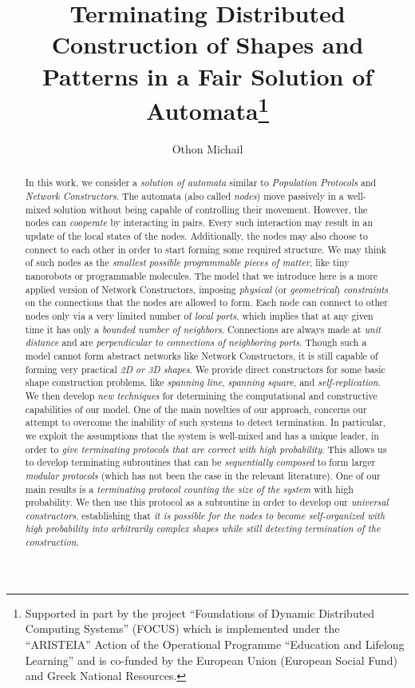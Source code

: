\documentclass[oribibl, 11pt]{llncs}
\title{Terminating Distributed Construction of Shapes and Patterns in a Fair Solution of Automata\thanks{Supported in part by the project ``Foundations of Dynamic Distributed Computing Systems'' (\textsf{FOCUS}) which is implemented under the ``ARISTEIA'' Action of the  Operational Programme ``Education and Lifelong Learning'' and is co-funded by the European Union (European Social Fund) and Greek National Resources.}}
\author{Othon Michail}
\institute{Computer Technology Institute \& Press ``Diophantus'' (CTI), Patras, Greece\\
Email:\email{ michailo@cti.gr}\\ Phone: +30 2610 960300}
\begin{document}
\maketitle

\begin{abstract}
In this work, we consider a \emph{solution of automata} similar to \emph{Population Protocols} and \emph{Network Constructors}. The automata (also called \emph{nodes}) move passively in a well-mixed solution without being capable of controlling their movement. However, the nodes can \emph{cooperate} by interacting in pairs. Every such interaction may result in an update of the local states of the nodes. Additionally, the nodes may also choose to connect to each other in order to start forming some required structure. We may think of such nodes as the \emph{smallest possible programmable pieces of matter}, like tiny nanorobots or programmable molecules. The model that we introduce here is a more applied version of Network Constructors, imposing \emph{physical} (or \emph{geometrical}) \emph{constraints} on the connections that the nodes are allowed to form. Each node can connect to other nodes only via a very limited number of \emph{local ports}, which implies that at any given time it has only a \emph{bounded number of neighbors}. Connections are always made at \emph{unit distance} and are \emph{perpendicular to connections of neighboring ports}. Though such a model cannot form abstract networks like Network Constructors, it is still capable of forming very practical \emph{2D or 3D shapes}. We provide direct constructors for some basic shape construction problems, like \emph{spanning line}, \emph{spanning square}, and \emph{self-replication}. We then develop \emph{new techniques} for determining the computational and constructive capabilities of our model. One of the main novelties of our approach, concerns our attempt to overcome the inability of such systems to detect termination. In particular, we exploit the assumptions that the system is well-mixed and has a unique leader, in order to \emph{give terminating protocols that are correct with high probability}. This allows us to develop terminating subroutines that can be \emph{sequentially composed} to form larger \emph{modular protocols} (which has not been the case in the relevant literature). One of our main results is a \emph{terminating protocol counting the size  of the system} with high probability. We then use this protocol as a subroutine in order to develop our \emph{universal constructors}, establishing that \emph{it is possible for the nodes to become self-organized with high probability into arbitrarily complex shapes while still detecting termination of the construction}.
\end{abstract}
\end{document}
